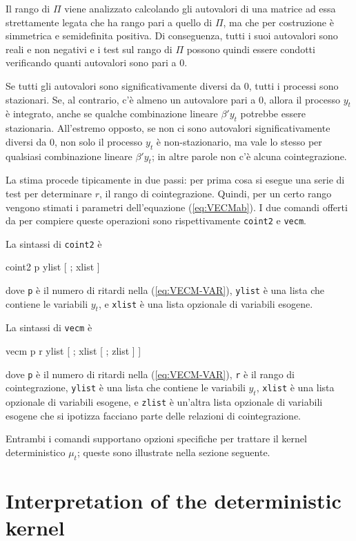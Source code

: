 Il rango di $\Pi$ viene analizzato calcolando gli autovalori di una matrice ad
essa strettamente legata che ha rango pari a quello di $\Pi$, ma che per
costruzione è simmetrica e semidefinita positiva. Di conseguenza, tutti i suoi
autovalori sono reali e non negativi e i test sul rango di $\Pi$ possono quindi
essere condotti verificando quanti autovalori sono pari a 0.

Se tutti gli autovalori sono significativamente diversi da 0, tutti i processi
sono stazionari. Se, al contrario, c'è almeno un autovalore pari a 0, allora
il processo $y_t$ è integrato, anche se qualche combinazione lineare $\beta'y_t$
potrebbe essere stazionaria. All'estremo opposto, se non ci sono autovalori
significativamente diversi da 0, non solo il processo $y_t$ è non-stazionario,
ma vale lo stesso per qualsiasi combinazione lineare $\beta'y_t$; in altre
parole non c'è alcuna cointegrazione.

La stima procede tipicamente in due passi: per prima cosa si esegue una serie di
test per determinare $r$, il rango di cointegrazione. Quindi, per un certo rango
vengono stimati i parametri dell'equazione (\ref{eq:VECMab}). I due comandi
offerti da  per compiere queste operazioni sono rispettivamente
\texttt{coint2} e \texttt{vecm}.

La sintassi di \texttt{coint2} è
\begin{code}
  coint2 p ylist [ ; xlist ]
\end{code}
dove \texttt{p} è il numero di ritardi nella (\ref{eq:VECM-VAR}),
\texttt{ylist} è una lista che contiene le variabili $y_t$, e
\texttt{xlist} è una lista opzionale di variabili esogene.

La sintassi di \texttt{vecm} è
\begin{code}
  vecm p r ylist [ ; xlist [ ; zlist ] ]
\end{code}
dove \texttt{p} è il numero di ritardi nella (\ref{eq:VECM-VAR}),
\texttt{r} è il rango di cointegrazione, \texttt{ylist} è una lista
che contiene le variabili $y_t$, \texttt{xlist} è una lista opzionale di
variabili esogene, e \texttt{zlist} è un'altra lista opzionale di variabili
esogene che si ipotizza facciano parte delle relazioni di cointegrazione.

Entrambi i comandi supportano opzioni specifiche per trattare il kernel
deterministico $\mu_t$; queste sono illustrate nella sezione seguente.

\section{Interpretation of the deterministic kernel}
\label{sec:coint-5cases}


